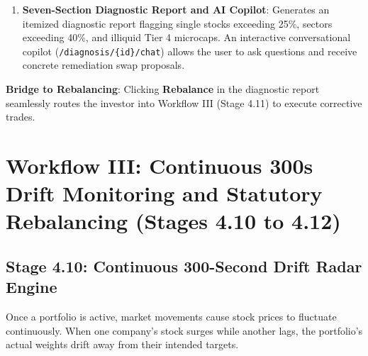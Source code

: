 \begin{enumerate}
\begin{itemize}
        \item $\text{HHI} < 1,500$: \textbf{Safe / Well Diversified}. Wealth is distributed healthily across multiple companies.
        \item $1,500 \le \text{HHI} \le 2,500$: \textbf{Moderate Concentration}. The portfolio is somewhat top-heavy and requires monitoring.
        \item $\text{HHI} > 2,500$: \textbf{High Risk / Dangerously Concentrated}. A large percentage of capital is tied up in one or two stocks, exposing the investor to severe loss if those companies suffer setbacks.
    \end{itemize}
    \item \textbf{Seven-Section Diagnostic Report and AI Copilot}:
    Generates an itemized diagnostic report flagging single stocks exceeding 25\%, sectors exceeding 40\%, and illiquid Tier 4 microcaps. An interactive conversational copilot (\texttt{/diagnosis/\{id\}/chat}) allows the user to ask questions and receive concrete remediation swap proposals.
\end{enumerate}

\noindent \textbf{Bridge to Rebalancing}: Clicking \textbf{Rebalance} in the diagnostic report seamlessly routes the investor into Workflow III (Stage 4.11) to execute corrective trades.

\section{Workflow III: Continuous 300s Drift Monitoring and Statutory Rebalancing (Stages 4.10 to 4.12)}

\subsection{Stage 4.10: Continuous 300-Second Drift Radar Engine}
Once a portfolio is active, market movements cause stock prices to fluctuate continuously. When one company's stock surges while another lags, the portfolio's actual weights drift away from their intended targets.

